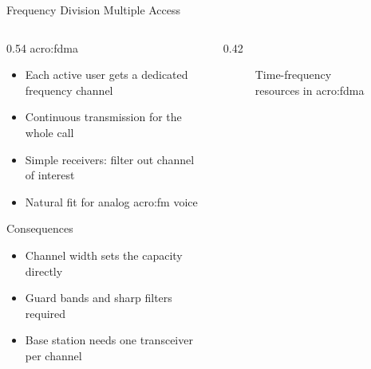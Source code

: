 
\begin{frame}{Frequency Division Multiple Access}
  \begin{columns}[T,onlytextwidth]
    \begin{column}{0.54\textwidth}
      \Gls{acro:fdma}
      \begin{itemize}
        \item Each active user gets a dedicated frequency channel
        \item Continuous transmission for the whole call
        \item Simple receivers: filter out channel of interest
        \item Natural fit for analog \gls{acro:fm} voice
      \end{itemize}
      \vspace{0.4em}
      Consequences
      \begin{itemize}
        \item Channel width sets the capacity directly
        \item Guard bands and sharp filters required
        \item Base station needs one transceiver per channel
      \end{itemize}
    \end{column}
    \begin{column}{0.42\textwidth}
      \begin{figure}
        \centering
        
        \caption{Time-frequency resources in \gls{acro:fdma}}
      \end{figure}
    \end{column}
  \end{columns}
\end{frame}

